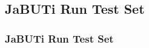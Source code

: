 \subsection{JaBUTi Run Test Set}
\label{example:jabuti-run-test-set}

\begin{frame}
\frametitle{JaBUTi Run Test Set}

\end{frame}
